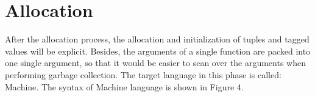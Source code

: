\documentclass{article}
\theoremstyle{definition}
\theoremstyle{remark}
\numberwithin{equation}{section}
\begin{document}

\section{Allocation}

After the allocation
 process, the allocation and initialization of tuples and tagged values will
be explicit. Besides, the arguments of a single function are packed into
one single argument, so that it would be easier to scan over the arguments
 when performing garbage collection. The target language in this phase is called:
 Machine. The syntax of Machine language is shown in Figure 4.
\end{document}
